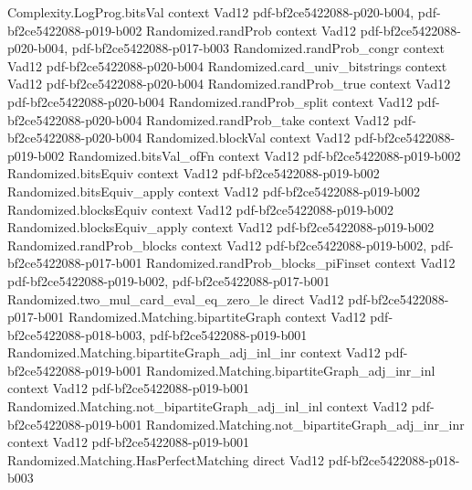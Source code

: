 \begin{theorem}
\label{Randomized.Matching.lovasz_test_zmod}
\leanok
\proofstep
  {Complexity.LogProg.bitsVal}
  {context}
  {Vad12}
  {pdf-bf2ce5422088-p020-b004,
    pdf-bf2ce5422088-p019-b002}
\proofstep
  {Randomized.randProb}
  {context}
  {Vad12}
  {pdf-bf2ce5422088-p020-b004,
    pdf-bf2ce5422088-p017-b003}
\proofstep
  {Randomized.randProb_congr}
  {context}
  {Vad12}
  {pdf-bf2ce5422088-p020-b004}
\proofstep
  {Randomized.card_univ_bitstrings}
  {context}
  {Vad12}
  {pdf-bf2ce5422088-p020-b004}
\proofstep
  {Randomized.randProb_true}
  {context}
  {Vad12}
  {pdf-bf2ce5422088-p020-b004}
\proofstep
  {Randomized.randProb_split}
  {context}
  {Vad12}
  {pdf-bf2ce5422088-p020-b004}
\proofstep
  {Randomized.randProb_take}
  {context}
  {Vad12}
  {pdf-bf2ce5422088-p020-b004}
\proofstep
  {Randomized.blockVal}
  {context}
  {Vad12}
  {pdf-bf2ce5422088-p019-b002}
\proofstep
  {Randomized.bitsVal_ofFn}
  {context}
  {Vad12}
  {pdf-bf2ce5422088-p019-b002}
\proofstep
  {Randomized.bitsEquiv}
  {context}
  {Vad12}
  {pdf-bf2ce5422088-p019-b002}
\proofstep
  {Randomized.bitsEquiv_apply}
  {context}
  {Vad12}
  {pdf-bf2ce5422088-p019-b002}
\proofstep
  {Randomized.blocksEquiv}
  {context}
  {Vad12}
  {pdf-bf2ce5422088-p019-b002}
\proofstep
  {Randomized.blocksEquiv_apply}
  {context}
  {Vad12}
  {pdf-bf2ce5422088-p019-b002}
\proofstep
  {Randomized.randProb_blocks}
  {context}
  {Vad12}
  {pdf-bf2ce5422088-p019-b002,
    pdf-bf2ce5422088-p017-b001}
\proofstep
  {Randomized.randProb_blocks_piFinset}
  {context}
  {Vad12}
  {pdf-bf2ce5422088-p019-b002,
    pdf-bf2ce5422088-p017-b001}
\proofstep
  {Randomized.two_mul_card_eval_eq_zero_le}
  {direct}
  {Vad12}
  {pdf-bf2ce5422088-p017-b001}
\proofstep
  {Randomized.Matching.bipartiteGraph}
  {context}
  {Vad12}
  {pdf-bf2ce5422088-p018-b003,
    pdf-bf2ce5422088-p019-b001}
\proofstep
  {Randomized.Matching.bipartiteGraph_adj_inl_inr}
  {context}
  {Vad12}
  {pdf-bf2ce5422088-p019-b001}
\proofstep
  {Randomized.Matching.bipartiteGraph_adj_inr_inl}
  {context}
  {Vad12}
  {pdf-bf2ce5422088-p019-b001}
\proofstep
  {Randomized.Matching.not_bipartiteGraph_adj_inl_inl}
  {context}
  {Vad12}
  {pdf-bf2ce5422088-p019-b001}
\proofstep
  {Randomized.Matching.not_bipartiteGraph_adj_inr_inr}
  {context}
  {Vad12}
  {pdf-bf2ce5422088-p019-b001}
\proofstep
  {Randomized.Matching.HasPerfectMatching}
  {direct}
  {Vad12}
  {pdf-bf2ce5422088-p018-b003}

\end{theorem}
